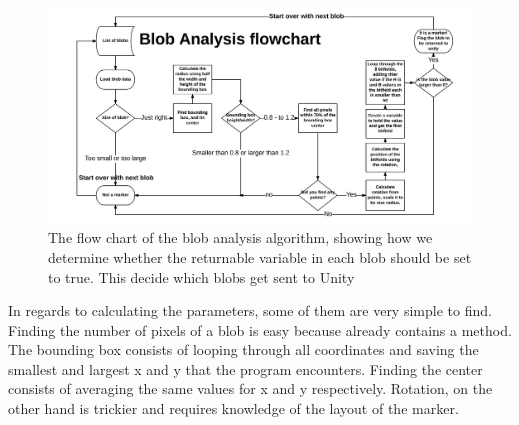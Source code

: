 \begin{figure}[H]
	\centering
	\includegraphics[width=1\linewidth]{figure/Analysis/flowchart.png}
	\caption{The flow chart of the blob analysis algorithm, showing how we determine whether the returnable variable in each blob should be set to true. This decide which blobs get sent to Unity}
	\label{fig:flow}
\end{figure}
In regards to calculating the parameters, some of them are very simple to find. Finding the number of pixels of a blob is easy because  already contains a  method. The bounding box consists of looping through all coordinates and saving the smallest and largest x and y that the program encounters. Finding the center consists of averaging the same values for x and y respectively. Rotation, on the other hand is trickier and requires knowledge of the layout of the marker.
  
